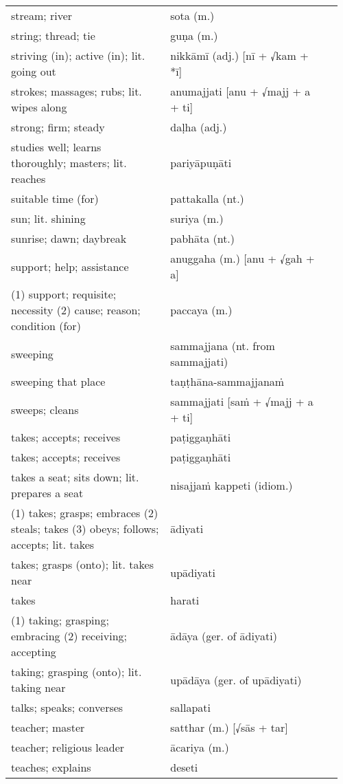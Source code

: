 \documentclass[a5paper]{memoir}
\begin{document}
\begin{longtable}{L{0.48\linewidth} L{0.48\linewidth} H}
stream; river & sota (m.) & \\[0pt]
string; thread; tie & guṇa (m.) & \\[0pt]
striving (in); active (in); lit. going out & nikkāmī (adj.) [nī + √kam + *ī] & \\[0pt]
strokes; massages; rubs; lit. wipes along & anumajjati [anu + √majj + a + ti] & \\[0pt]
strong; firm; steady & daḷha (adj.) & \\[0pt]
studies well; learns thoroughly; masters; lit. reaches & pariyāpuṇāti & \\[0pt]
suitable time (for) & pattakalla (nt.) & \\[0pt]
sun; lit. shining & suriya (m.) & \\[0pt]
sunrise; dawn; daybreak & pabhāta (nt.) & \\[0pt]
support; help; assistance & anuggaha (m.) [anu + √gah + a] & \\[0pt]
(1) support; requisite; necessity (2) cause; reason; condition (for) & paccaya (m.) & \\[0pt]
sweeping & sammajjana (nt. from sammajjati) & \\[0pt]
sweeping that place & taṇṭhāna-sammajjanaṁ & \\[0pt]
sweeps; cleans & sammajjati [saṁ + √majj + a + ti] & \\[0pt]
takes; accepts; receives & paṭiggaṇhāti & \\[0pt]
takes; accepts; receives & paṭiggaṇhāti & \\[0pt]
takes a seat; sits down; lit. prepares a seat & nisajjaṁ kappeti (idiom.) & \\[0pt]
(1) takes; grasps; embraces (2) steals; takes (3) obeys; follows; accepts; lit. takes & ādiyati & \\[0pt]
takes; grasps (onto); lit. takes near & upādiyati & \\[0pt]
takes & harati & \\[0pt]
(1) taking; grasping; embracing (2) receiving; accepting & ādāya (ger. of ādiyati) & \\[0pt]
taking; grasping (onto); lit. taking near & upādāya (ger. of upādiyati) & \\[0pt]
talks; speaks; converses & sallapati & \\[0pt]
teacher; master & satthar (m.) [√sās + tar] & \\[0pt]
teacher; religious leader & ācariya (m.) & \\[0pt]
teaches; explains & deseti & \\[0pt]

\end{longtable}
\end{document}
